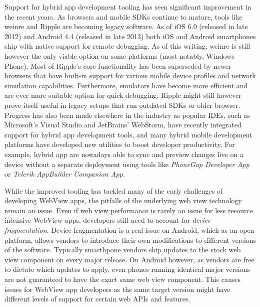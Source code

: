 \documentclass[thesis.tex]{subfiles}
\begin{document}
Support for hybrid app development tooling has seen significant improvement in the recent years. As browsers and mobile SDKs continue to mature, tools like weinre and Ripple are becoming legacy software. As of iOS 6.0 (released in late 2012) and Android 4.4 (released in late 2013) both iOS and Android smartphones ship with native support for remote debugging. As of this writing, weinre is still however the only viable option on some platforms (most notably, Windows Phone). Most of Ripple's core functionality has been superseded by newer browsers that have built-in support for various mobile device profiles and network simulation capabilities. Furthermore, emulators have become more efficient and are ever more suitable option for quick debugging. Ripple might still however prove itself useful in legacy setups that run outdated SDKs or older browser. Progress has also been made elsewhere in the industry as popular IDEs, such as Microsoft's Visual Studio and JetBrains' WebStorm, have recently integrated support for hybrid app development tools, and many hybrid mobile development platforms have developed new utilities to boost developer productivity. For example, hybrid app are nowadays able to sync and preview changes live on a device without a separate deployment using tools like \textit{PhoneGap Developer App} or \textit{Telerik AppBuilder Companion App}.

While the improved tooling has tackled many of the early challenges of developing WebView apps, the pitfalls of the underlying web view technology remain an issue. Even if web view performance is rarely an issue for less resource intensive WebView apps, developers still need to account for \textit{device fragmentation}. Device fragmentation is a real issue on Android, which as an open platform, allows vendors to introduce their own modifications to different versions of the software. Typically smarthpone vendors ship updates to the stock web view component on every major release. On Android however, as vendors are free to dictate which updates to apply, even phones running identical major versions are not guaranteed to have the exact same web view component. This causes issues for WebView app developers as the same target version might have different levels of support for certain web APIs and features.
\end{document}
